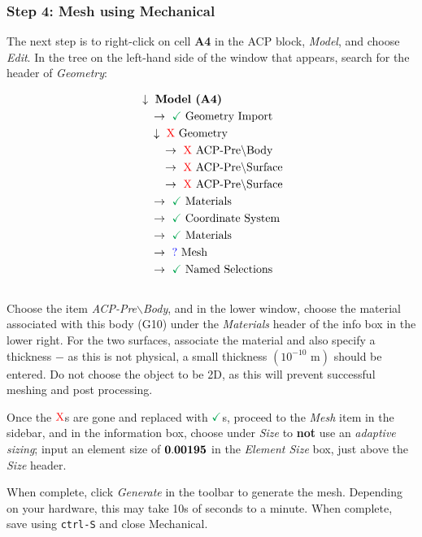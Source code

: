 \documentclass{amsdtx}
\begin{document}
\subsubsection{Step 4: Mesh using Mechanical}
The next step is to right-click on cell {\bf A4} in the ACP block, \textit{Model}, and choose \textit{Edit}. In the tree on the left-hand side of the window that appears, search for the header of \textit{Geometry}:~\\[-3em]
\begin{multicols}{2}
	\begin{align*}
	&\downarrow ~\text{\bf Model (A4)} \\
	&\quad \rightarrow~{\color{Green}\checkmark}~\text{Geometry Import}\\
	&\quad \downarrow~{\color{red}\rm X}~\text{Geometry}\\
	&\quad \quad \rightarrow~{\color{red}\rm X}~\text{ACP-Pre$\backslash$Body}\\
	&\quad \quad \rightarrow~{\color{red}\rm X}~\text{ACP-Pre$\backslash$Surface}\\
	&\quad \quad \rightarrow~{\color{red}\rm X}~\text{ACP-Pre$\backslash$Surface}\\
	&\quad \rightarrow~{\color{Green}\checkmark}~\text{Materials}\\
	&\quad \rightarrow~{\color{Green}\checkmark}~\text{Coordinate System}\\
	&\quad \rightarrow~{\color{Green}\checkmark}~\text{Materials}\\
	&\quad \rightarrow~{\color{blue}\rm ?}~\text{Mesh}\\
	&\quad \rightarrow~{\color{Green}\checkmark}~\text{Named Selections}
\end{align*}
~\\[.5em]Choose the item \textit{ACP-Pre$\backslash$Body}, and in the lower window, choose the material associated with this body (G10) under the \textit{Materials} header of the info box in the lower right. For the two surfaces, associate the material and also specify a thickness $-$ as this is not physical, a small thickness $\left(10^{-10}\text{ m}\right)$ should be entered. Do not choose the object to be 2D, as this will prevent successful meshing and post processing.

Once the $\color{red} \rm X$s are gone and replaced with ${\color{Green}\checkmark}$s, proceed to the \textit{Mesh} item in the sidebar, and in the information box, choose under \textit{Size} to \textbf{\color{red} not} use an \textit{adaptive sizing}; input an element size of $\bf{0.00195}$ in the \textit{Element Size} box, just above the \textit{Size} header. 
\end{multicols}
When complete, click \textit{Generate} in the toolbar to generate the mesh. Depending on your hardware, this may take 10s of seconds to a minute. When complete, save using \verb|ctrl-S| and close Mechanical.
\end{document}
